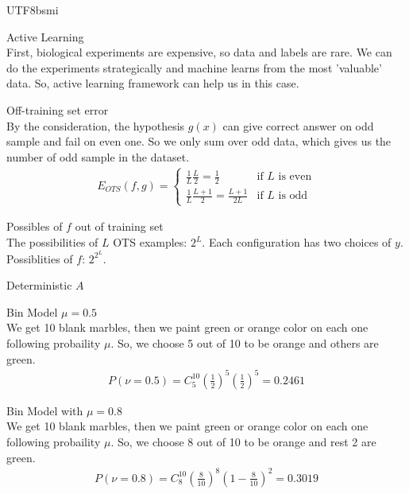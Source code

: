 \documentclass[12pt]{article}
\newenvironment{prob}[2][Prob.]{\begin{trivlist}
\item[\hskip \labelsep {\bfseries #1}\hskip \labelsep {\bfseries #2}]}{\end{trivlist}}
\begin{document}
\begin{CJK}{UTF8}{bsmi}
\begin{prob}{5} Active Learning \\
First, biological experiments are expensive, so data and labels are rare. 
We can do the experiments strategically and machine learns from the most 'valuable' data. So, active learning framework can help us in this case.
\end{prob}

\begin{prob}{6} Off-training set error \\
	By the consideration, the hypothesis $g(x)$ can give correct answer on odd sample and fail on even one. 
	So we only sum over odd data, which gives us the number of odd sample in the dataset.
	\begin{align*}
		E_{OTS}(f,g) = 
		\begin{cases}
			\frac{1}{L}\frac{L}{2} = \frac{1}{2} & \text{if } L \text{ is even} \\
			\frac{1}{L}\frac{L+1}{2} = \frac{L+1}{2L} & \text{if } L \text{ is odd}
		\end{cases}
	\end{align*}
\end{prob}

\begin{prob}{7} Possibles of $f$ out of training set\\
The possibilities of $L$ OTS examples: $2^L$. Each configuration has two choices of $y$. \\
Possiblities of $f$: $2^{2^{L}}$.
\end{prob}

\begin{prob}{8} Deterministic $A$\\
\end{prob}

\begin{prob}{9} Bin Model $\mu = 0.5$ \\
We get 10 blank marbles, then we paint green or orange color on each one following probaility $\mu$.
So, we choose 5 out of 10 to be orange and others are green.
\begin{align*}
	P(\nu = 0.5) = C^{10}_{5} (\frac{1}{2})^5(\frac{1}{2})^5 = 0.2461
\end{align*}
\end{prob}

\begin{prob}{10} Bin Model with $\mu = 0.8$ \\
We get 10 blank marbles, then we paint green or orange color on each one following probaility $\mu$.
So, we choose 8 out of 10 to be orange and rest 2 are green.
\begin{align*}
	P(\nu = 0.8) = C^{10}_{8} (\frac{8}{10})^8(1-\frac{8}{10})^2 = 0.3019
\end{align*}
\end{prob}


\end{CJK}
\end{document}
